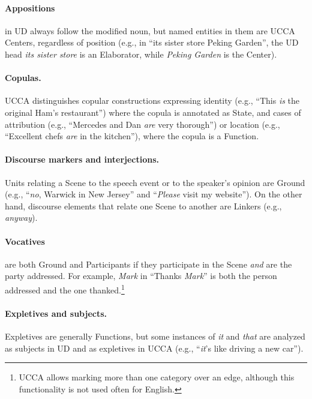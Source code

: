 \documentclass[11pt,a4paper]{article}
\begin{document}
\paragraph{Appositions}
    in UD always follow the modified noun,
    but named entities in them are UCCA Centers, regardless of position
    (e.g., in ``its sister store Peking Garden'', the UD head \textit{its sister store}
    is an Elaborator, while \textit{Peking Garden} is the Center).

\paragraph{Copulas.}
    UCCA distinguishes copular constructions expressing
    identity (e.g., ``This \textit{is} the original Ham's restaurant'') where the copula is annotated as State,
    and cases of attribution 
    (e.g., ``Mercedes and Dan \textit{are} very thorough'')
    or location (e.g., ``Excellent chefs \textit{are} in the kitchen''),
    where the copula is a Function.

\paragraph{Discourse markers and interjections.}
    Units relating a Scene to the speech event or to the speaker's opinion are Ground
    (e.g., ``\textit{no}, Warwick in New Jersey'' and ``\textit{Please} visit my website'').
    On the other hand, discourse elements that relate one Scene to another 
    are Linkers (e.g., \textit{anyway}).

\paragraph{Vocatives}
    are both Ground and Participants if they participate in the Scene \textit{and} are the party addressed.
    For example, \textit{Mark} in ``Thanks \textit{Mark}'' is both the person addressed and the one thanked.\footnote{UCCA allows marking more than one category over an edge, although this
    functionality is not used often for English.}
    
\paragraph{Expletives and subjects.}
    Expletives are generally Functions,
    but some instances of \textit{it} and \textit{that} are analyzed as subjects in UD
    and as expletives in UCCA (e.g., ``\textit{it}'s like driving a new car'').    
\end{document}
